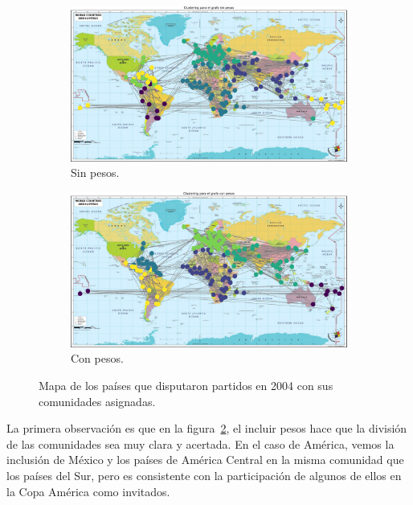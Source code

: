\documentclass{article}
\begin{document}
\begin{figure}[htb]
    \centering
    \begin{subfigure}{0.49\textwidth}
        \centering
        \includegraphics[width=\linewidth]{images/mapas/mapa_sin_pesos_2004.pdf}
        \caption{Sin pesos.}
        \label{fig:2004_sin_pesos}
    \end{subfigure}
    \begin{subfigure}{0.49\textwidth}
        \centering
        \includegraphics[width=\linewidth]{images/mapas/mapa_con_pesos_2004.pdf}
        \caption{Con pesos.}
        \label{fig:2004_con_pesos}
    \end{subfigure}
    \caption{Mapa de los países que disputaron partidos en 2004 con sus comunidades asignadas.}
    \label{fig:mapa_2004}
\end{figure}

La primera observación es que en la figura~\ref{fig:2004_con_pesos}, el incluir pesos hace que la 
división de las comunidades sea muy clara y acertada. En el caso de América, vemos la inclusión de
México y los países de América Central en la misma comunidad que los países del Sur, pero es consistente
con la participación de algunos de ellos en la Copa América como invitados.
\end{document}
